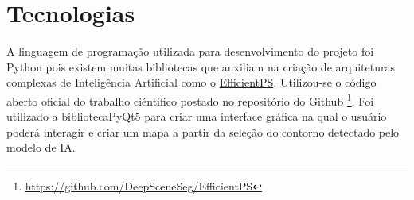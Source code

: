 \section{Tecnologias}

A linguagem de programação utilizada para desenvolvimento do projeto foi Python pois existem muitas bibliotecas que auxiliam na criação de arquiteturas complexas de Inteligência Artificial como o \hyperref[sec:EfficientPS]{EfficientPS}. Utilizou-se o código aberto oficial do trabalho ciéntifico postado no repositório do Github \footnote{\url{https://github.com/DeepSceneSeg/EfficientPS}}.
Foi utilizado a bibliotecaPyQt5 para criar uma interface gráfica na qual o usuário poderá interagir e criar um mapa a partir da seleção do contorno detectado pelo modelo de IA.